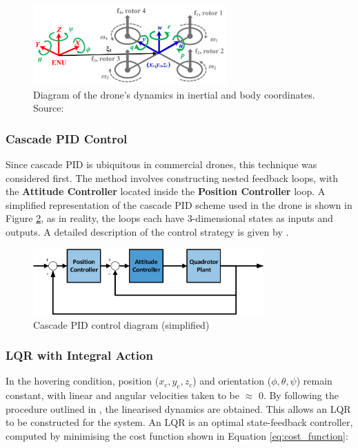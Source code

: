 \begin{figure}[H]
\centering
\includegraphics[width=0.66\textwidth]{figs/Samuel/Figures/nekoo1-0005-large.png}
\caption[Diagram of the drone's dynamics in inertial and body coordinates]{Diagram of the drone's dynamics in inertial and body coordinates. Source: \cite{nekoo}}
\label{fig:nekoodiag}
\end{figure}

\subsubsection{Cascade PID Control}
Since cascade \gls{PID} is ubiquitous in commercial drones, this technique was considered first. The method involves constructing nested feedback loops, with the \textbf{Attitude Controller} located inside the \textbf{Position Controller} loop. A simplified representation of the cascade \gls{PID} scheme used in the drone is shown in Figure \ref{fig:pidloop}, as in reality, the loops each have 3-dimensional states as inputs and outputs. A detailed description of the control strategy is given by \cite{electronics10040376}.

\begin{figure}[H]
\centering
\includegraphics[width=0.79\textwidth]{figs/Samuel/Figures/Control Loop-cropped.pdf}
\caption{Cascade PID control diagram (simplified)}
\label{fig:pidloop}
\end{figure}




\subsubsection{LQR with Integral Action}
\label{sec:symbs}

In the hovering condition, position (\(x_c, y_c, z_c\)) and orientation (\(\phi, \theta, \psi\)) remain constant, with linear and angular velocities taken to be $\approx$ 0. By following the procedure outlined in \cite{cengiz2024quadcopter}, the linearised dynamics are obtained. This allows an \gls{LQR} to be constructed for the system. An LQR is an optimal state-feedback controller, computed by minimising the cost function shown in Equation \ref{eq:cost_function}:

